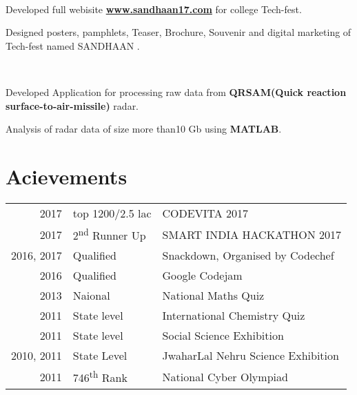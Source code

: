 \documentclass[a4paper]{deedy-resume} %
\begin{document}
\begin{minipage}[t]{0.66\textwidth}
\begin{tightitemize}
\end{tightitemize}
\sectionspace
{}\\

\begin{tightitemize}
\item Developed full webisite \href{http://www.sandhaan17.com} {\bf www.sandhaan17.com}  for college Tech-fest.
\item Designed posters, pamphlets, Teaser, Brochure, Souvenir and digital marketing of Tech-fest named SANDHAAN .
\end{tightitemize}
\sectionspace
 \\

\begin{tightitemize}
\item Developed Application for processing  raw data from \textbf{ QRSAM(Quick reaction surface-to-air-missile)} radar.
\item Analysis of radar data of size more than10 Gb using \textbf{MATLAB}.
\end{tightitemize}


\sectionspace %


\section{Acievements} 

\begin{tabular}{rll}
2017	 & top 1200/2.5 lac & CODEVITA 2017 \\
2017	 & 2\textsuperscript{nd} Runner Up &  SMART INDIA HACKATHON 2017\\
2016, 2017	 & Qualified & Snackdown, Organised by Codechef\\
2016	 & Qualified & Google Codejam\\
2013 & Naional & National Maths Quiz\\
2011 & State level& International Chemistry Quiz\\
2011 & State level & Social Science Exhibition \\
2010, 2011 & State Level & JwaharLal Nehru Science Exhibition\\
2011 & 746\textsuperscript{th} Rank & National Cyber Olympiad\\
\end{tabular}


\end{minipage}
\end{document}
